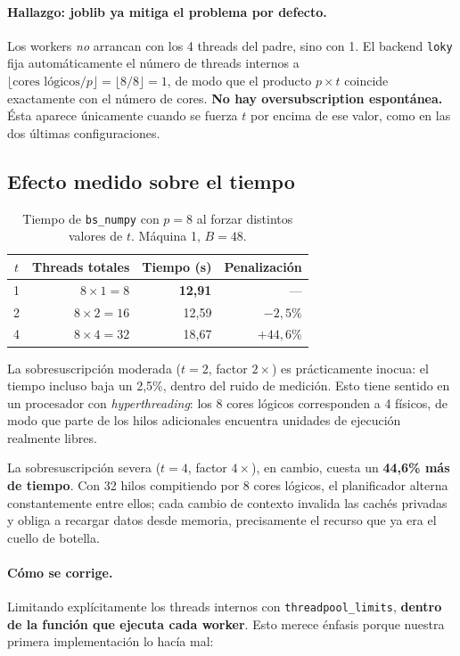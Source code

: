 \documentclass[11pt,letterpaper]{article}
\begin{document}
\paragraph{Hallazgo: joblib ya mitiga el problema por defecto.}
Los workers \emph{no} arrancan con los 4 threads del padre, sino con 1. El backend
\texttt{loky} fija automáticamente el número de threads internos a
$\lfloor \text{cores lógicos} / p \rfloor = \lfloor 8/8 \rfloor = 1$, de modo que el
producto $p \times t$ coincide exactamente con el número de cores. \textbf{No hay
oversubscription espontánea.} Ésta aparece únicamente cuando se fuerza $t$ por encima de
ese valor, como en las dos últimas configuraciones.

\subsection{Efecto medido sobre el tiempo}

\begin{table}[H]
\centering
\caption{Tiempo de \texttt{bs\_numpy} con $p = 8$ al forzar distintos valores de $t$.
         Máquina 1, $B = 48$.}
\label{tab:oversub}
\small
\begin{tabular}{crrr}
\toprule
$t$ & \textbf{Threads totales} & \textbf{Tiempo (s)} & \textbf{Penalización} \\
\midrule
1 & $8 \times 1 = 8$  & \textbf{12{,}91} & --- \\
2 & $8 \times 2 = 16$ & 12{,}59 & $-2{,}5\%$ \\
4 & $8 \times 4 = 32$ & 18{,}67 & $+44{,}6\%$ \\
\bottomrule
\end{tabular}
\end{table}

La sobresuscripción moderada ($t = 2$, factor $2\times$) es prácticamente inocua: el
tiempo incluso baja un 2,5\%, dentro del ruido de medición. Esto tiene sentido en un
procesador con \textit{hyperthreading}: los 8 cores lógicos corresponden a 4 físicos, de
modo que parte de los hilos adicionales encuentra unidades de ejecución realmente libres.

La sobresuscripción severa ($t = 4$, factor $4\times$), en cambio, cuesta un
\textbf{44,6\% más de tiempo}. Con 32 hilos compitiendo por 8 cores lógicos, el
planificador alterna constantemente entre ellos; cada cambio de contexto invalida las
cachés privadas y obliga a recargar datos desde memoria, precisamente el recurso que ya
era el cuello de botella.

\paragraph{Cómo se corrige.} Limitando explícitamente los threads internos con
\texttt{threadpool\_limits}, \textbf{dentro de la función que ejecuta cada worker}. Esto
merece énfasis porque nuestra primera implementación lo hacía mal:
\end{document}
